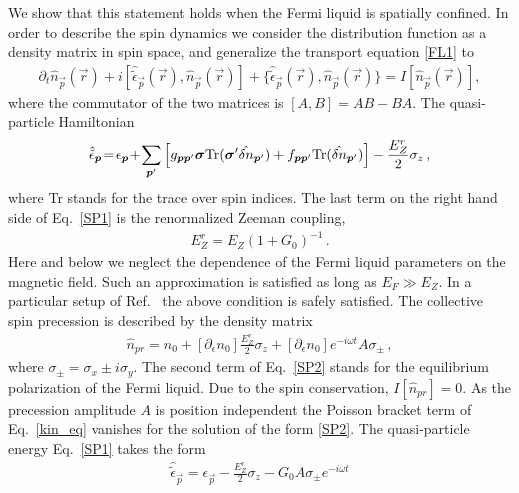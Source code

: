 We show that this statement holds when the Fermi liquid is spatially confined.
In order to describe the spin dynamics we consider the distribution function as a density matrix in spin space, and generalize the transport equation \eqref{FL1} to \cite{Pitaevskii1980}
\begin{align}\label{kin_eq}
\partial_t  \hat{n}_{\vec{p}}(\vec{r}) \!+\! i[\hat{\tilde{\epsilon}}_{\vec{p}}(\vec{r}),\! \hat{n}_{\vec{p}}(\vec{r})]\! +\!
\{\hat{\tilde{\epsilon}}_{\vec{p}}(\vec{r}), \!\hat{n}_{\vec{p}}(\vec{r})\}\!=\! I[\hat{n}_{\vec{p}}(\vec{r})],
\end{align}
where the commutator of the two matrices is $[A,B] = AB - BA$.
The quasi-particle Hamiltonian 
\begin{align}\label{SP1}
\hat{\tilde{\epsilon}}_{\vec{p}}\! =\! 
\epsilon_{\vec{p}}\! +\! \sum_{\vec{p}'}\left[ g_{\vec{p}\vec{p}'} \vec{\sigma} \Tr (\vec{\sigma}' \hat{\delta n}_{\vec{p}'})
+ f_{\vec{p}\vec{p}'} \Tr ( \hat{\delta n}_{\vec{p}'})\right]
-\frac{E_Z^r}{2}\sigma_z\, ,
\end{align}
where Tr stands for the trace over spin indices.
The last term on the right hand side of Eq.~\eqref{SP1} is the renormalized Zeeman coupling, \cite{Pitaevskii1980} 
\begin{align}\label{Zeeman_bare}
E_Z^r = E_Z(1 +G_0)^{-1}\, . 
\end{align}
Here and below we neglect the dependence of the Fermi liquid parameters on the magnetic field.
Such an approximation is satisfied as long as $E_F \gg E_Z$.
In a particular setup of Ref.~\cite{Frolov2009} the above condition is safely satisfied.
The collective spin precession is described by the density matrix 
\begin{align}\label{SP2}
\hat{n}_{pr} = n_0  + [\partial_{\epsilon} n_0] \frac{E_Z^r}{2}\sigma_z + [\partial_{\epsilon} n_0] e^{-i \omega t} A \sigma_{\pm}\, ,
\end{align}
where $\sigma_{\pm} = \sigma_x \pm i \sigma_y$.
The second term of Eq.~\eqref{SP2} stands for the equilibrium polarization of the Fermi liquid.
Due to the spin conservation, $I[\hat{n}_{pr} ]  = 0$.
As the precession amplitude $A$ is position independent the Poisson bracket term of Eq.~\eqref{kin_eq} vanishes for the solution of the form \eqref{SP2}.
The quasi-particle energy Eq.~\eqref{SP1} takes the form
\begin{align}\label{SP3}
\hat{\tilde{\epsilon}}_{\vec{p}} = 
\epsilon_{\vec{p}} 
- \frac{E_Z^r}{2}\sigma_z
- G_0 A \sigma_{\pm} e^{-i \omega t} 
\end{align}
